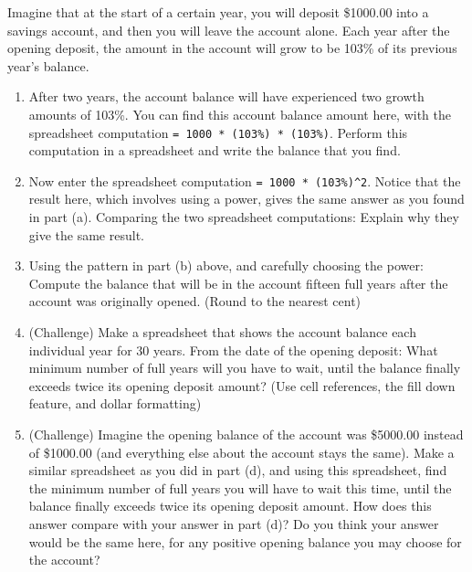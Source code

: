 \begin{stmt}
Imagine that at the start of a certain year, you will deposit \$1000.00 into a savings account, and then you will leave the account alone. Each year after the opening deposit, the amount in the account will grow to be 103\% of its previous year's balance.
\begin{enumerate}[label=(\alph*), leftmargin=2em, topsep=2pt, itemsep=1pt]
\item After two years, the account balance will have experienced two growth amounts of 103\%. You can find this account balance amount here, with the spreadsheet computation \texttt{= 1000 * (103\%) * (103\%)}. Perform this computation in a spreadsheet and write the balance that you find.
\item Now enter the spreadsheet computation \texttt{= 1000 * (103\%)\textasciicircum 2}. Notice that the result here, which involves using a power, gives the same answer as you found in part (a). Comparing the two spreadsheet computations: Explain why they give the same result.
\item Using the pattern in part (b) above, and carefully choosing the power: Compute the balance that will be in the account fifteen full years after the account was originally opened. (Round to the nearest cent)
\item (Challenge) Make a spreadsheet that shows the account balance each individual year for 30 years. From the date of the opening deposit: What minimum number of full years will you have to wait, until the balance finally exceeds twice its opening deposit amount? (Use cell references, the fill down feature, and dollar formatting)
\item (Challenge) Imagine the opening balance of the account was \$5000.00 instead of \$1000.00 (and everything else about the account stays the same). Make a similar spreadsheet as you did in part (d), and using this spreadsheet, find the minimum number of full years you will have to wait this time, until the balance finally exceeds twice its opening deposit amount. How does this answer compare with your answer in part (d)? Do you think your answer would be the same here, for any positive opening balance you may choose for the account?
\end{enumerate}
\end{stmt}

